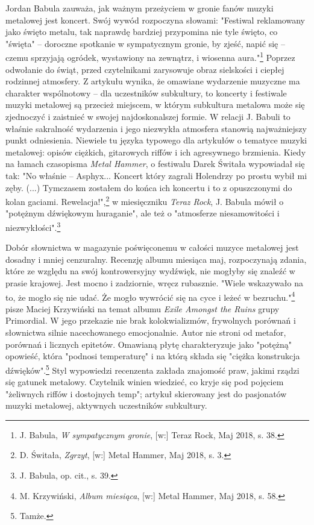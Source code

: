 \documentclass[12pt, a4paper, titlepage]{report}
\begin{document}
Jordan Babula zauważa, jak ważnym przeżyciem w gronie fanów muzyki metalowej jest koncert. Swój wywód rozpoczyna słowami: "Festiwal reklamowany jako święto metalu, tak naprawdę bardziej przypomina nie tyle święto, co "święta" -- doroczne spotkanie w sympatycznym gronie, by zjeść, napić się -- czemu sprzyjają ogródek, wystawiony na zewnątrz, i wiosenna aura."\footnote{J. Babula, \textit{W sympatycznym gronie}, [w:] Teraz Rock, Maj 2018, s. 38.} Poprzez odwołanie do świąt, przed czytelnikami zarysowuje obraz sielskości i ciepłej rodzinnej atmosfery. Z artykułu wynika, że omawiane wydarzenie muzyczne ma charakter wspólnotowy -- dla uczestników subkultury, to koncerty i festiwale muzyki metalowej są przecież miejscem, w którym subkultura metalowa może się zjednoczyć i zaistnieć w swojej najdoskonalszej formie. W relacji J. Babuli to właśnie sakralność wydarzenia i jego niezwykła atmosfera stanowią najważniejszy punkt odniesienia. Niewiele tu języka typowego dla artykułów o tematyce muzyki metalowej: opisów ciężkich, gitarowych riffów i ich agresywnego brzmienia. Kiedy na łamach czasopisma \textit{Metal Hammer}, o festiwalu Darek Świtała wypowiadał się tak: "No właśnie – Asphyx... Koncert który zagrali Holendrzy po prostu wybił mi zęby. (...) Tymczasem zostałem do końca ich koncertu i to z opuszczonymi do kolan gaciami. Rewelacja!",\footnote{D. Świtała, \textit{Zgrzyt}, [w:] Metal Hammer, Maj 2018, s. 3.} w miesięczniku \textit{Teraz Rock}, J. Babula mówił o "potężnym dźwiękowym huraganie", ale też o "atmosferze niesamowitości i niezwykłości".\footnote{J. Babula, op. cit., s. 39.}

Dobór słownictwa w magazynie poświęconemu w całości muzyce metalowej jest dosadny i mniej cenzuralny. Recenzję albumu miesiąca maj, rozpoczynają zdania, które ze względu na swój kontrowersyjny wydźwięk, nie mogłyby się znaleźć w prasie krajowej. Jest mocno i zadziornie, wręcz rubasznie. "Wiele wskazywało na to, że mogło się nie udać. Że mogło wywrócić się na cyce i leżeć w bezruchu."\footnote{M. Krzywiński, \textit{Album miesiąca}, [w:] Metal Hammer, Maj 2018, s. 58.} pisze Maciej Krzywiński na temat albumu \textit{Exile Amongst the Ruins} grupy Primordial. W jego przekazie nie brak kolokwializmów, frywolnych porównań i słownictwa silnie nacechowanego emocjonalnie. Autor nie stroni od metafor, porównań i licznych epitetów. Omawianą płytę charakteryzuje jako "potężną" opowieść, która "podnosi temperaturę" i na którą składa się "ciężka konstrukcja dźwięków".\footnote{Tamże.} Styl wypowiedzi recenzenta zakłada znajomość praw, jakimi rządzi się gatunek metalowy. Czytelnik winien wiedzieć, co kryje się pod pojęciem "żeliwnych riffów i dostojnych temp"; artykuł skierowany jest do pasjonatów muzyki metalowej, aktywnych uczestników subkultury. 
\end{document}
